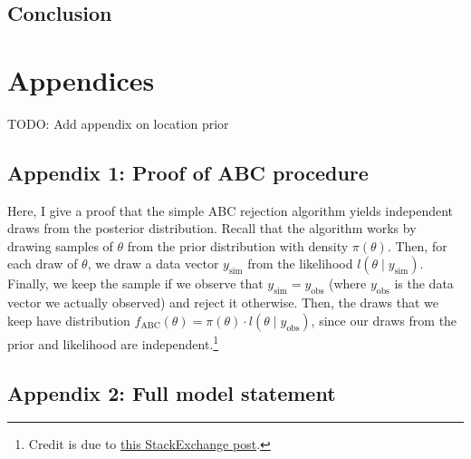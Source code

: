 \documentclass[
  oneside]{book}
\begin{document}
\hypertarget{conclusion-2}{%
\section{Conclusion}\label{conclusion-2}}

\renewcommand{\baselinestretch}{1}\normalsize

\hypertarget{appendices}{%
\chapter{Appendices}\label{appendices}}

TODO: Add appendix on location prior

\hypertarget{appendix-1-proof-of-abc-procedure}{%
\section{Appendix 1: Proof of ABC procedure}\label{appendix-1-proof-of-abc-procedure}}

Here, I give a proof that the simple ABC rejection algorithm yields independent draws from the posterior distribution. Recall that the algorithm works by drawing samples of \(\theta\) from the prior distribution with density \(\pi (\theta)\). Then, for each draw of \(\theta\), we draw a data vector \(y_{\text {sim}}\) from the likelihood \(l(\theta \mid y_{\text{sim}})\). Finally, we keep the sample if we observe that \(y_{\text{sim}} = y_{\text{obs}}\) (where \(y_{\text{obs}}\) is the data vector we actually observed) and reject it otherwise. Then, the draws that we keep have distribution \(f_{\text{ABC}}(\theta) = \pi(\theta) \cdot l(\theta \mid y_{\text{obs}})\), since our draws from the prior and likelihood are independent.\footnote{Credit is due to \href{https://stats.stackexchange.com/questions/380076/proof-of-approximate-exact-bayesian-computation.}{this StackExchange post}.}

\hypertarget{appendix-2-full-model-statement}{%
\section{Appendix 2: Full model statement}\label{appendix-2-full-model-statement}}
\end{document}

